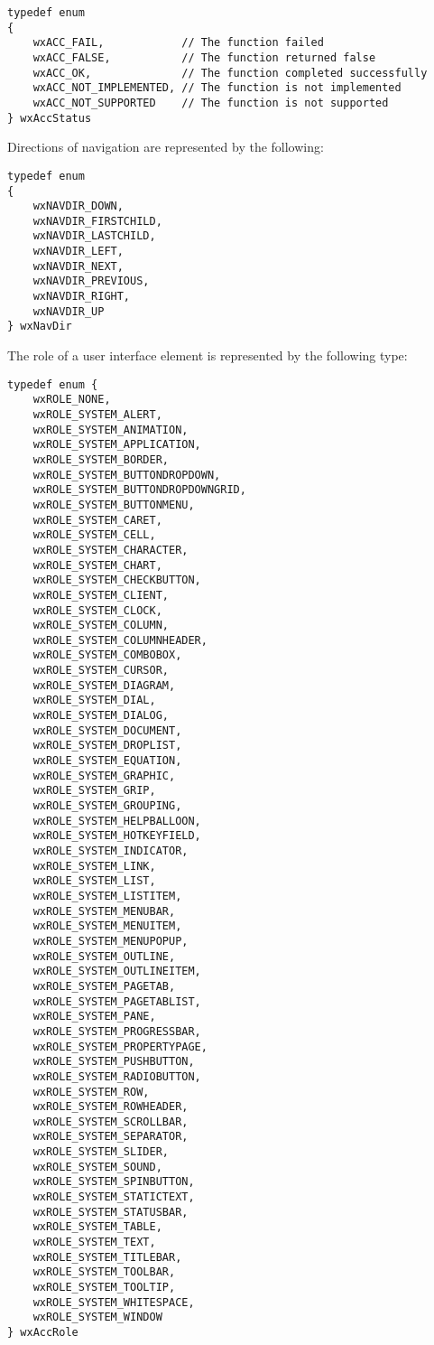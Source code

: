 {\small 
\begin{verbatim}
typedef enum
{
    wxACC_FAIL,            // The function failed
    wxACC_FALSE,           // The function returned false
    wxACC_OK,              // The function completed successfully
    wxACC_NOT_IMPLEMENTED, // The function is not implemented
    wxACC_NOT_SUPPORTED    // The function is not supported
} wxAccStatus
\end{verbatim}
}

Directions of navigation are represented by
the following:

{\small 
\begin{verbatim}
typedef enum
{
    wxNAVDIR_DOWN,
    wxNAVDIR_FIRSTCHILD,
    wxNAVDIR_LASTCHILD,
    wxNAVDIR_LEFT,
    wxNAVDIR_NEXT,
    wxNAVDIR_PREVIOUS,
    wxNAVDIR_RIGHT,
    wxNAVDIR_UP
} wxNavDir
\end{verbatim}
}

The role of a user interface element is represented
by the following type:

{\small 
\begin{verbatim}
typedef enum {  
    wxROLE_NONE,
    wxROLE_SYSTEM_ALERT,
    wxROLE_SYSTEM_ANIMATION,
    wxROLE_SYSTEM_APPLICATION,
    wxROLE_SYSTEM_BORDER,
    wxROLE_SYSTEM_BUTTONDROPDOWN,
    wxROLE_SYSTEM_BUTTONDROPDOWNGRID,
    wxROLE_SYSTEM_BUTTONMENU,
    wxROLE_SYSTEM_CARET,
    wxROLE_SYSTEM_CELL,
    wxROLE_SYSTEM_CHARACTER,
    wxROLE_SYSTEM_CHART,
    wxROLE_SYSTEM_CHECKBUTTON,
    wxROLE_SYSTEM_CLIENT,
    wxROLE_SYSTEM_CLOCK,
    wxROLE_SYSTEM_COLUMN,
    wxROLE_SYSTEM_COLUMNHEADER,
    wxROLE_SYSTEM_COMBOBOX,
    wxROLE_SYSTEM_CURSOR,
    wxROLE_SYSTEM_DIAGRAM,
    wxROLE_SYSTEM_DIAL,
    wxROLE_SYSTEM_DIALOG,
    wxROLE_SYSTEM_DOCUMENT,
    wxROLE_SYSTEM_DROPLIST,
    wxROLE_SYSTEM_EQUATION,
    wxROLE_SYSTEM_GRAPHIC,
    wxROLE_SYSTEM_GRIP,
    wxROLE_SYSTEM_GROUPING,
    wxROLE_SYSTEM_HELPBALLOON,
    wxROLE_SYSTEM_HOTKEYFIELD,
    wxROLE_SYSTEM_INDICATOR,
    wxROLE_SYSTEM_LINK,
    wxROLE_SYSTEM_LIST,
    wxROLE_SYSTEM_LISTITEM,
    wxROLE_SYSTEM_MENUBAR,
    wxROLE_SYSTEM_MENUITEM,
    wxROLE_SYSTEM_MENUPOPUP,
    wxROLE_SYSTEM_OUTLINE,
    wxROLE_SYSTEM_OUTLINEITEM,
    wxROLE_SYSTEM_PAGETAB,
    wxROLE_SYSTEM_PAGETABLIST,
    wxROLE_SYSTEM_PANE,
    wxROLE_SYSTEM_PROGRESSBAR,
    wxROLE_SYSTEM_PROPERTYPAGE,
    wxROLE_SYSTEM_PUSHBUTTON,
    wxROLE_SYSTEM_RADIOBUTTON,
    wxROLE_SYSTEM_ROW,
    wxROLE_SYSTEM_ROWHEADER,
    wxROLE_SYSTEM_SCROLLBAR,
    wxROLE_SYSTEM_SEPARATOR,
    wxROLE_SYSTEM_SLIDER,
    wxROLE_SYSTEM_SOUND,
    wxROLE_SYSTEM_SPINBUTTON,
    wxROLE_SYSTEM_STATICTEXT,
    wxROLE_SYSTEM_STATUSBAR,
    wxROLE_SYSTEM_TABLE,
    wxROLE_SYSTEM_TEXT,
    wxROLE_SYSTEM_TITLEBAR,
    wxROLE_SYSTEM_TOOLBAR,
    wxROLE_SYSTEM_TOOLTIP,
    wxROLE_SYSTEM_WHITESPACE,
    wxROLE_SYSTEM_WINDOW
} wxAccRole
\end{verbatim}
}

